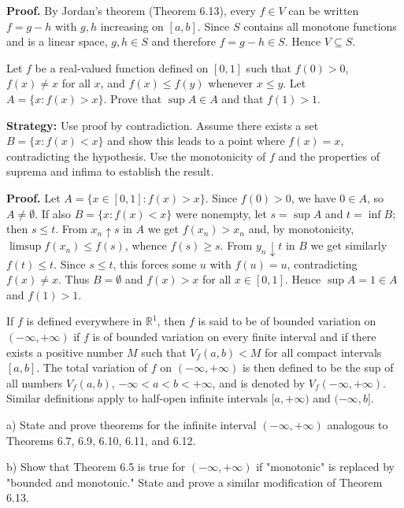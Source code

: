 \noindent\textbf{Proof.}
By Jordan’s theorem (Theorem 6.13), every $f\in V$ can be written $f=g-h$ with $g,h$ increasing on $[a,b]$. Since $S$ contains all monotone functions and is a linear space, $g,h\in S$ and therefore $f=g-h\in S$. Hence $V\subseteq S$.



\begin{problembox}
\begin{problemstatement}
Let $f$ be a real-valued function defined on $[0, 1]$ such that $f(0) > 0$, $f(x) \neq x$ for all $x$, and $f(x) \leq f(y)$ whenever $x \leq y$. Let $A = \{x: f(x) > x\}$. Prove that $\sup A \in A$ and that $f(1) > 1$.
\end{problemstatement}
\end{problembox}

\noindent\textbf{Strategy:} Use proof by contradiction. Assume there exists a set $B = \{x: f(x) < x\}$ and show this leads to a point where $f(x) = x$, contradicting the hypothesis. Use the monotonicity of $f$ and the properties of suprema and infima to establish the result.

\noindent\textbf{Proof.}
Let $A=\{x\in[0,1]: f(x)>x\}$. Since $f(0)>0$, we have $0\in A$, so $A\neq\emptyset$. If also $B=\{x: f(x)<x\}$ were nonempty, let $s=\sup A$ and $t=\inf B$; then $s\le t$. From $x_n\uparrow s$ in $A$ we get $f(x_n)>x_n$ and, by monotonicity, $\limsup f(x_n)\le f(s)$, whence $f(s)\ge s$. From $y_n\downarrow t$ in $B$ we get similarly $f(t)\le t$. Since $s\le t$, this forces some $u$ with $f(u)=u$, contradicting $f(x)\ne x$. Thus $B=\emptyset$ and $f(x)>x$ for all $x\in[0,1]$. Hence $\sup A=1\in A$ and $f(1)>1$.



\begin{problembox}
\begin{problemstatement}
If $f$ is defined everywhere in $\mathbb{R}^1$, then $f$ is said to be of bounded variation on $(-\infty, +\infty)$ if $f$ is of bounded variation on every finite interval and if there exists a positive number $M$ such that $V_f(a, b) < M$ for all compact intervals $[a, b]$. The total variation of $f$ on $(-\infty, +\infty)$ is then defined to be the sup of all numbers $V_f(a, b)$, $-\infty < a < b < +\infty$, and is denoted by $V_f(-\infty, +\infty)$. Similar definitions apply to half-open infinite intervals $[a, +\infty)$ and $(-\infty, b]$.

a) State and prove theorems for the infinite interval $(-\infty, +\infty)$ analogous to Theorems 6.7, 6.9, 6.10, 6.11, and 6.12.

b) Show that Theorem 6.5 is true for $(-\infty, +\infty)$ if "monotonic" is replaced by "bounded and monotonic." State and prove a similar modification of Theorem 6.13.
\end{problemstatement}
\end{problembox}

